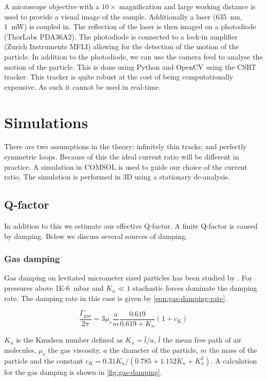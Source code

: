 A microscope objective with a $10\times$ magnification and large working distance is used to provide a visual image of the sample. Additionally a laser (\qty{635}{\nm}, \qty{1}{\milli\watt}) is coupled in. The reflection of the laser is then imaged on a photodiode (ThorLabs PDA36A2). The photodiode is connected to a lock-in amplifier (Zurich Instruments MFLI) allowing for the detection of the motion of the particle. In addition to the photodiode, we can use the camera feed to analyse the motion of the particle. This is done using Python and OpenCV using the CSRT tracker. This tracker is quite robust at the cost of being computationally expensive. As such it cannot be used in real-time.

\section{Simulations}
There are two assumptions in the theory: infinitely thin tracks; and perfectly symmetric loops. Because of this the ideal current ratio will be different in practice. A simulation in COMSOL is used to guide our choice of the current ratio. The simulation is performed in 3D using a stationary dc-analysis.

\subsection{Q-factor}
\label{subsec:q-factor}
In addition to this we estimate our effective Q-factor. A finite Q-factor is caused by damping. Below we discuss several sources of damping.

\subsubsection{Gas damping}
\label{subsubsec:gas-damping}
Gas damping on levitated micrometer sized particles has been studied by \citeauthor{millen}. For pressures above \qty{1E-6}{\milli\bar} and $K_n \ll 1$ stachastic forces dominate the damping rate. The damping rate in this case is given by \autoref{eqn:gas-damping-rate}.

\begin{equation}
    \frac{\Gamma_{\text {gas}}}{2 \pi}=3 \mu_v \frac{a}{m} \frac{0.619}{0.619+K_n} \left( 1+c_K \right)
    \label{eqn:gas-damping-rate}
\end{equation}

$K_n$ is the Knudsen number defined as $K_n = \bar{l}/a$, $\bar{l}$ the mean free path of air molecules, $\mu_v$ the gas viscosity, $a$ the diameter of the particle, $m$ the mass of the particle and the constant $c_K = 0.31 K_n / \left(0.785 + 1.152 K_n + K_n^2 \right)$. A calculation for the gas damping is shown in \autoref{fig:gas-damping}.

